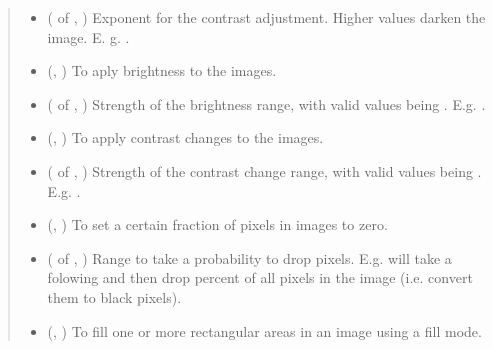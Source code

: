 \documentclass[letterpaper,10pt,english]{sphinxmanual}
\begin{document}
\begin{fulllineitems}
\begin{quote}
\begin{description}
\begin{itemize}
\item {} 
 ( of , ) \textendash{} Exponent for the contrast adjustment. Higher values darken the image. E. g. .

\item {} 
 (, ) \textendash{} To aply brightness to the images.

\item {} 
 ( of , ) \textendash{} Strength of the brightness range, with valid values being . E.g. .

\item {} 
 (, ) \textendash{} To apply contrast changes to the images.

\item {} 
 ( of , ) \textendash{} Strength of the contrast change range, with valid values being . E.g. .

\item {} 
 (, ) \textendash{} To set a certain fraction of pixels in images to zero.

\item {} 
 ( of , ) \textendash{} Range to take a probability  to drop pixels. E.g.  will take a  folowing 
and then drop  percent of all pixels in the image (i.e. convert them to black pixels).

\item {} 
 (, ) \textendash{} To fill one or more rectangular areas in an image using a fill mode.


\end{itemize}
\end{description}
\end{quote}
\end{fulllineitems}
\end{document}
